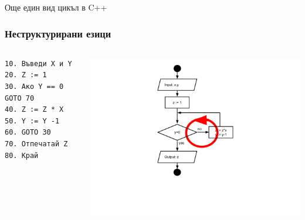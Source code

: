 \documentclass{beamer}
\begin{document}
\begin{frame}
\centerline{Още един вид цикъл в C++}
\end{frame}


\begin{frame}[fragile]
\frametitle{Неструктурирани езици}

\begin{columns}[t]
  \begin{column}{0.3\textwidth}

\begin{verbatim}
10. Въведи X и Y
20. Z := 1
30. Ако Y == 0 GOTO 70
40. Z := Z * X
50. Y := Y -1
60. GOTO 30
70. Отпечатай Z
80. Край   
\end{verbatim}

  \end{column}
  \begin{column}{0.7\textwidth}

\hspace*{-90pt}
\includegraphics[width=12cm]{images/fc_cycle_arrows} 


  \end{column}
\end{columns}


\end{frame}
\end{document}

